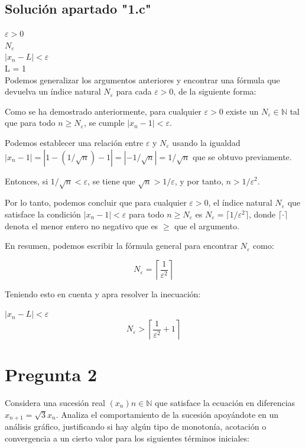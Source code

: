 \documentclass{article}
\begin{document}
\subsection{Solución apartado "1.c"}

$\varepsilon > 0$ \\
$N_{\varepsilon}$\\ $| x_{n} -L | < \varepsilon$\\
L = 1\\

Podemos generalizar los argumentos anteriores y encontrar una fórmula que devuelva un índice natural $N_{\varepsilon}$ para cada $\varepsilon > 0$, de la siguiente forma:

Como se ha demostrado anteriormente, para cualquier $\varepsilon > 0$ existe un $N_{\varepsilon} \in \mathbb{N}$ tal que para todo $n \geq N_{\varepsilon}$, se cumple $| x_{n} - 1 | < \varepsilon$.

Podemos establecer una relación entre $\varepsilon$ y $N_{\varepsilon}$ usando la igualdad $| x_{n} - 1 | = | 1- (1/\sqrt{n})-1| = |-1/\sqrt{n}| = 1/\sqrt{n}$ que se obtuvo previamente.

Entonces, si $1/\sqrt{n} < \varepsilon$, se tiene que $\sqrt{n} > 1/\varepsilon$, y por tanto, $n > 1/\varepsilon^2$.

Por lo tanto, podemos concluir que para cualquier $\varepsilon > 0$, el índice natural $N_{\varepsilon}$ que satisface la condición $| x_{n} - 1 | < \varepsilon$ para todo $n \geq N_{\varepsilon}$ es $N_{\varepsilon} = \lceil 1/\varepsilon^2 \rceil$, donde $\lceil \cdot \rceil$ denota el menor entero no negativo que es $\geq$ que el argumento.

En resumen, podemos escribir la fórmula general para encontrar $N_{\varepsilon}$ como:

$$N_{\varepsilon} = \left\lceil \frac{1}{\varepsilon^2} \right\rceil$$

Teniendo esto en cuenta y apra resolver la inecuación:

$| x_{n} -L | < \varepsilon$\\

$$N_{\varepsilon} > \left\lceil \frac{1}{\varepsilon^2} + 1 \right\rceil$$

\section{Pregunta 2}

Considera una sucesión real $(x_n){n \in \mathbb{N}}$ que satisface la ecuación en diferencias $x_{n+1} = \sqrt{3} x_n$. Analiza el comportamiento de la sucesión apoyándote en un análisis gráfico, justificando si hay algún tipo de monotonía, acotación o convergencia a un cierto valor para los siguientes términos iniciales:
\end{document}
